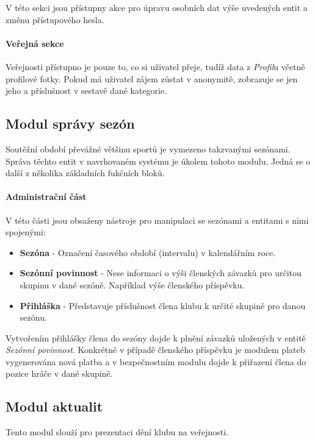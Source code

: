 \documentclass[11pt,oneside]{fithesis}
\begin{document}
            V této sekci jsou přístupny akce pro úpravu osobních dat výše uvedených entit a změnu přístupového hesla.

            \paragraph*{Veřejná sekce}

            Veřejnosti přístupno je pouze to, co si uživatel přeje, tudíž data z \textit{Profil}u včetně profilové fotky. Pokud má uživatel zájem zůstat v anonymitě, zobrazuje se jen jeho  a příslušnost v sestavě dané kategorie.

            \subsection{Modul správy sezón}
            Soutěžní období převážné většinu sportů je vymezeno takzvanými sezónami. Správa těchto entit v navrhovaném systému je úkolem tohoto modulu. Jedná se o další z několika základních fukčních bloků.

            \paragraph*{Administrační část}

            V této části jsou obsaženy nástroje pro manipulaci se sezónami a entitami s nimi spojenými:
            \begin{itemize}
                \item \textbf{Sezóna} - Označení časového období (intervalu) v kalendářním roce.
                \item \textbf{Sezónní povinnost} - Nese informaci o výši členských závazků pro určitou skupinu v dané sezóně. Například výše členského příspěvku.
                \item \textbf{Přihláška} - Představuje příslušnost člena klubu k určité skupině pro danou sezónu.
            \end{itemize}

            Vytvořením přihlášky člena do sezóny dojde k plnění závazků uložených v entitě \textit{Sezónní povinnost}. Konkrétně v případě členského příspěvku je modulem plateb vygenerována nová platba a v bezpečnostním modulu dojde k přiřazení člena do pozice hráče v dané skupině.

            \subsection{Modul aktualit}
            Tento modul slouží pro prezentaci dění klubu na veřejnosti.
\end{document}
